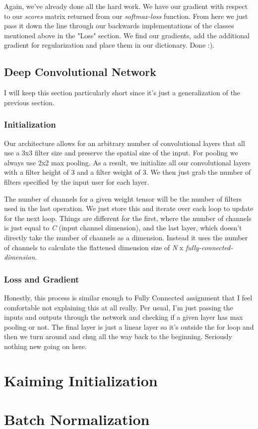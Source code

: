 \documentclass[12pt]{article}
\begin{document}
Again, we've already done all the hard work. We have our gradient with respect to our \emph{scores} matrix returned 
from our \emph{softmax-loss} function. From here we just pass it down the line through our backwards
implementations of the classes mentioned above in the "Loss" section. We find our gradients, add
the additional gradient for regularization and place them in our dictionary. Done :). 

\subsection{Deep Convolutional Network}
I will keep this section particularly short since it's just a generalization of the previous 
section.

\subsubsection{Initialization}
Our architecture allows for an arbitrary number of convolutional layers that all 
use a 3x3 filter size and preserve the spatial size of the input. For pooling we always 
use 2x2 max pooling. As a result, we initialize all our convolutional layers with a filter 
height of 3 and a filter weight of 3. We then just grab the number of filters specified 
by the input user for each layer. 

The number of channels for a given weight tensor will be the number of filters used in the last 
operation. We just store this and iterate over each loop to update for the next loop. Things are 
different for the first, where the number of channels is just equal to \emph{C} (input channel dimension),
and the last layer, which doesn't directly take the number of channels as a dimension. Instead it 
uses the number of channels to calculate the flattened dimension size of \emph{N} x \emph{fully-connected-dimension}. 

\subsubsection{Loss and Gradient}
Honestly, this process is similar enough to Fully Connected assignment that I feel comfortable 
not explaining this at all really. Per usual, I'm just passing the inputs and outputs through the 
network and checking if a given layer has max pooling or not. The final layer is just a linear 
layer so it's outside the for loop and then we turn around and chug all the way back to the beginning. 
Seriously nothing new going on here. 

\section{Kaiming Initialization}


\section{Batch Normalization}
\end{document}
